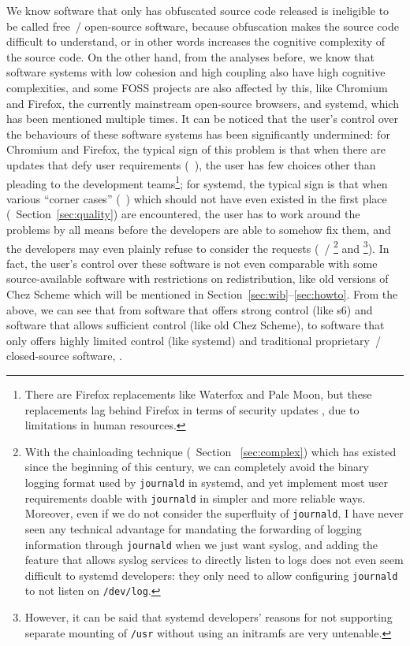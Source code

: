 We know software that only has obfuscated source code released is ineligible
to be called free~/ open-source software, because obfuscation makes the
source code difficult to understand, or in other words increases the cognitive
complexity of the source code.  On the other hand, from the analyses before,
we know that software systems with low cohesion and high coupling also have
high cognitive complexities, and some FOSS projects are also affected by
this, like Chromium and Firefox, the currently mainstream open-source browsers,
and systemd, which has been mentioned multiple times.  It can be noticed
that the user's control over the behaviours of these software systems has
been significantly undermined: for Chromium and Firefox, the typical sign
of this problem is that when there are updates that defy user requirements
(\eg~\parencite{beauhd2019, namelessvoice2018}), the user has few choices
other than pleading to the development teams\footnote{There are Firefox
replacements like Waterfox and Pale Moon, but these replacements lag behind
Firefox in terms of security updates \etc, due to limitations in human
resources.}; for systemd, the typical sign is that
when various ``corner cases'' (\eg~\parencite{ratagupt2017}) which should
not have even existed in the first place (\cf~Section~\ref{sec:quality})
are encountered, the user has to work around the problems by all means before
the developers are able to somehow fix them, and the developers may even
plainly refuse to consider the requests (\eg~\parencite{akcaagac2013}/%
\parencite{junta2017}\footnote{With the chainloading technique (\cf~Section~%
\ref{sec:complex}) which has existed since the beginning of this century, we
can completely avoid the binary logging format used by \texttt{journald} in
systemd, and yet implement most user requirements doable with \texttt{journald}
in simpler and more reliable ways.  Moreover, even if we do not consider the
superfluity of \texttt{journald}, I have never seen any technical advantage
for mandating the forwarding of logging information through \texttt{journald}
when we just want syslog, and adding the feature that allows syslog
services to directly listen to logs does not even seem difficult to systemd
developers: they only need to allow configuring \texttt{journald} to not
listen on \texttt{/dev/log}.} and \parencite{freedesktop:sepusr}\footnote%
{However, it can be said that systemd developers' reasons for not supporting
separate mounting of \texttt{/usr} without using an initramfs are very
untenable.}).  In fact, the user's control over
these software is not even comparable with some source-available software
with restrictions on redistribution, like old versions of Chez Scheme which
will be mentioned in Section~\ref{sec:wib}--\ref{sec:howto}.  From the above,
we can see that from software that offers strong control (like s6) and software
that allows sufficient control (like old Chez Scheme), to software that only
offers highly limited control (like systemd) and traditional proprietary~/
closed-source software, .

